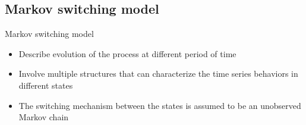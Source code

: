 \documentclass{beamer}
\begin{document}
\subsection{Markov switching model}
\begin{frame}[fragile]
Markov switching model \cite{p1}

\begin{itemize}
\item Describe evolution of the process at different period of time
\item Involve multiple structures that can characterize the time series behaviors in different states
\item The switching mechanism between the states is assumed to be an unobserved Markov chain
\end{itemize}

\end{frame}
\end{document}
